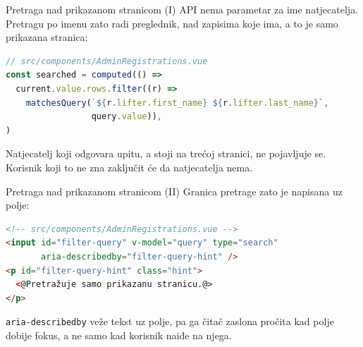 \begin{frame}[fragile]{Pretraga nad prikazanom stranicom (I)}
API nema parametar za ime natjecatelja. Pretragu po imenu zato radi preglednik, nad zapisima koje ima, a to je samo prikazana stranica:

\begin{lstlisting}[language=typescript]
// src/components/AdminRegistrations.vue
const searched = computed(() =>
  current.value.rows.filter((r) =>
    matchesQuery(`${r.lifter.first_name} ${r.lifter.last_name}`,
                 query.value)),
)
\end{lstlisting}

\vspace{0.3em}
Natjecatelj koji odgovara upitu, a stoji na trećoj stranici, ne pojavljuje se. Korisnik koji to ne zna zaključit će da natjecatelja nema.
\end{frame}

\begin{frame}[fragile]{Pretraga nad prikazanom stranicom (II)}
Granica pretrage zato je napisana uz polje:

\begin{lstlisting}[language=html]
<!-- src/components/AdminRegistrations.vue -->
<input id="filter-query" v-model="query" type="search"
       aria-describedby="filter-query-hint" />
<p id="filter-query-hint" class="hint">
  <@Pretražuje samo prikazanu stranicu.@>
</p>
\end{lstlisting}

\vspace{0.3em}
\texttt{aria-describedby} veže tekst uz polje, pa ga čitač zaslona pročita kad polje dobije fokus, a ne samo kad korisnik naiđe na njega.
\end{frame}

